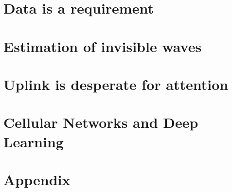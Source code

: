 \documentclass[nobib, b5paper]{tufte-book}
\begin{document}
\epigraphhead[350]{}
\part{Data is a requirement}



\epigraphhead[350]{}
\part{Estimation of invisible waves}





\epigraphhead[350]{}
\part{Uplink is desperate for attention}




\epigraphhead[350]{}
\part{Cellular Networks and Deep Learning}






\epigraphhead[350]{}
\part{Appendix}
\appendix












\backmatter



%
{\footnotesize
\printbibliography}


\end{document}
